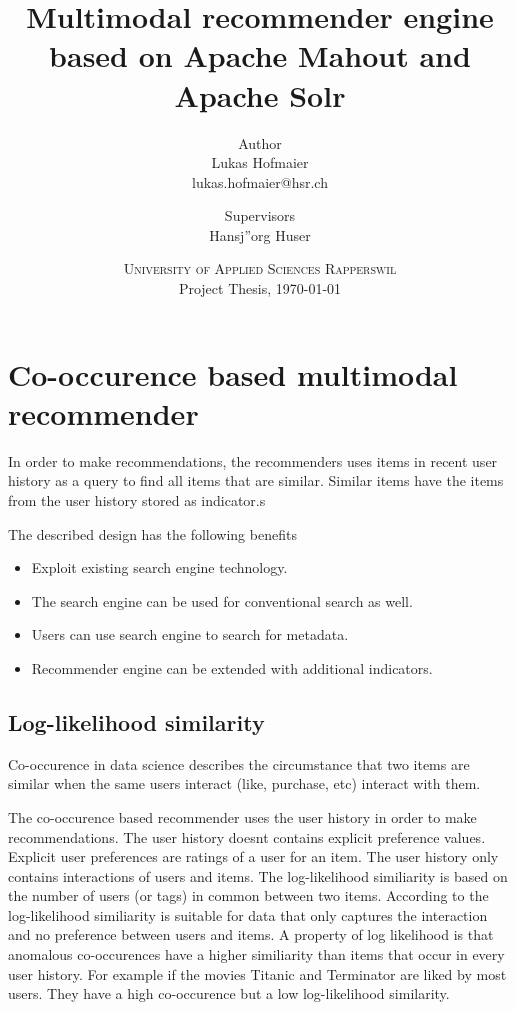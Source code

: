\documentclass[twoside,a4paper]{article}
\title{ Multimodal recommender engine based on Apache Mahout and Apache Solr }
\author{
	Author \\
	Lukas Hofmaier \\
	lukas.hofmaier@hsr.ch
 	\and
	Supervisors \\
        Hansj''org Huser
}
\date{
	\textsc{University of Applied Sciences Rapperswil}\\
	Project Thesis,
	\today
}
\begin{document}
\maketitle
\tableofcontents



\section{Co-occurence based multimodal recommender}
\label{sec:cooccurence}

In order to make recommendations, the recommenders uses items in recent user history as a query to find all items that are similar. Similar items have the items from the user history stored as indicator.s

The described design has the following benefits
\begin{itemize}
\item Exploit existing search engine technology.
\item The search engine can be used for conventional search as well.
\item Users can use search engine to search for metadata.
\item Recommender engine can be extended with additional indicators.
\end{itemize}

\subsection{Log-likelihood similarity}
\label{sec:llr}

Co-occurence in data science describes the circumstance that two items are similar when the same users interact (like, purchase, etc) interact with them.

The co-occurence based recommender uses the user history in order to make recommendations. The user history doesnt contains explicit preference values. Explicit user preferences are ratings of a user for an item. The user history only contains interactions of users and items. The log-likelihood similiarity is based on the number of users (or tags) in common between two items. According to \cite{Dunning93} the log-likelihood similiarity is suitable for data that only captures the interaction and no preference between users and items. A property of log likelihood is that anomalous co-occurences have a higher similiarity than items that occur in every user history. For example if the movies Titanic and Terminator are liked by most users. They have a high co-occurence but a low log-likelihood similarity.
\end{document}

